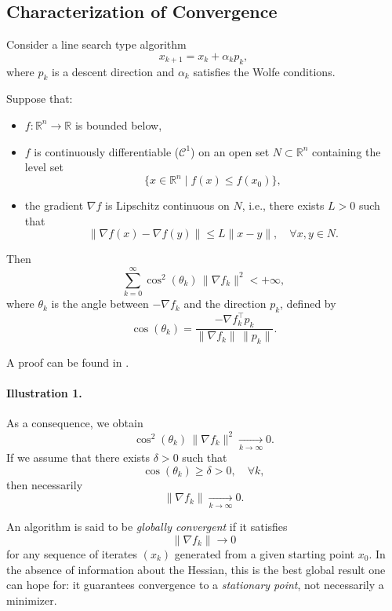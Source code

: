 \subsection{Characterization of Convergence}
\label{subsec:2.4.3}

Consider a line search type algorithm
\[
    x_{k+1} = x_k + \alpha_k p_k,
\]
where $p_k$ is a descent direction and $\alpha_k$ satisfies the Wolfe conditions.

\begin{theoreme}[Zoutendijk]
\label{thm:Zoutendijk}
Suppose that:
\begin{itemize}
    \item $f : \mathbb{R}^n \to \mathbb{R}$ is bounded below,
    \item $f$ is continuously differentiable ($\mathcal{C}^1$) on an open set $N \subset \mathbb{R}^n$
    containing the level set
    \[
        \{ x \in \mathbb{R}^n \;|\; f(x) \le f(x_0)\},
    \]
    \item the gradient $\nabla f$ is Lipschitz continuous on $N$, i.e., there exists $L>0$ such that
    \[
        \|\nabla f(x) - \nabla f(y)\| \le L \|x-y\|,
        \quad \forall x,y \in N.
    \]
\end{itemize}
Then
\begin{equation}
    \sum_{k=0}^{\infty} \cos^2(\theta_k)\,\|\nabla f_k\|^2 < +\infty,
\end{equation}
where $\theta_k$ is the angle between $-\nabla f_k$ and the direction $p_k$, defined by
\[
    \cos(\theta_k)
    = \frac{-\nabla f_k^\top p_k}{\|\nabla f_k\|\,\|p_k\|}.
\]
\end{theoreme}

\begin{remarque}
A proof can be found in \cite{nocedal2006numerical}.
\end{remarque}

\paragraph{Illustration 1.}
As a consequence, we obtain
\[
    \cos^2(\theta_k)\,\|\nabla f_k\|^2 \xrightarrow[k\to\infty]{} 0.
\]
If we assume that there exists $\delta>0$ such that
\[
    \cos(\theta_k) \ge \delta > 0, \quad \forall k,
\]
then necessarily
\[
    \|\nabla f_k\| \xrightarrow[k\to\infty]{} 0.
\]

\begin{definition}
An algorithm is said to be \emph{globally convergent} if it satisfies
\[
    \|\nabla f_k\| \to 0
\]
for any sequence of iterates $(x_k)$ generated from a given starting point $x_0$.
In the absence of information about the Hessian, this is the best global result
one can hope for: it guarantees convergence to a \emph{stationary point},
not necessarily a minimizer.
\end{definition}

